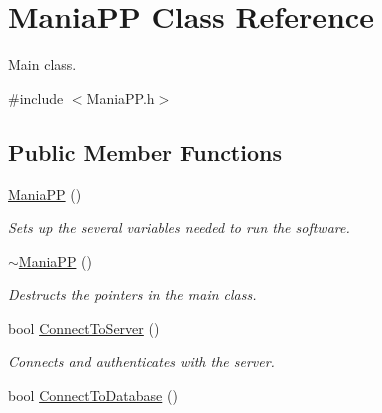 \hypertarget{classManiaPP}{\section{Mania\-P\-P Class Reference}
\label{classManiaPP}
}


Main class.  




{\ttfamily \#include $<$Mania\-P\-P.\-h$>$}

\subsection*{Public Member Functions}
\begin{DoxyCompactItemize}
\item 
\hypertarget{classManiaPP_ae56f6623dc89f2c0b75bec631cfc2d19}{\hyperlink{classManiaPP_ae56f6623dc89f2c0b75bec631cfc2d19}{Mania\-P\-P} ()}\label{classManiaPP_ae56f6623dc89f2c0b75bec631cfc2d19}

\begin{DoxyCompactList}\small\item\em Sets up the several variables needed to run the software. \end{DoxyCompactList}\item 
\hypertarget{classManiaPP_a1c78c3b51db550609011fb6fdcb26ec8}{\hyperlink{classManiaPP_a1c78c3b51db550609011fb6fdcb26ec8}{$\sim$\-Mania\-P\-P} ()}\label{classManiaPP_a1c78c3b51db550609011fb6fdcb26ec8}

\begin{DoxyCompactList}\small\item\em Destructs the pointers in the main class. \end{DoxyCompactList}\item 
\hypertarget{classManiaPP_a22561171876e54dbf633c70d9924c06a}{bool \hyperlink{classManiaPP_a22561171876e54dbf633c70d9924c06a}{Connect\-To\-Server} ()}\label{classManiaPP_a22561171876e54dbf633c70d9924c06a}

\begin{DoxyCompactList}\small\item\em Connects and authenticates with the server. \end{DoxyCompactList}\item 
\hypertarget{classManiaPP_a943b0ecd20ca8c9235411d16a743e5ac}{bool \hyperlink{classManiaPP_a943b0ecd20ca8c9235411d16a743e5ac}{Connect\-To\-Database} ()}\label{classManiaPP_a943b0ecd20ca8c9235411d16a743e5ac}


\end{DoxyCompactItemize}
